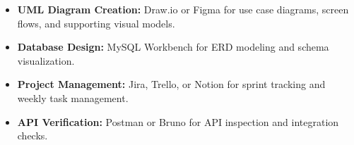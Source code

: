 \begin{itemize}
    \item \textbf{UML Diagram Creation:} Draw.io or Figma for use case diagrams, screen flows, and supporting visual models.
    \item \textbf{Database Design:} MySQL Workbench for ERD modeling and schema visualization.
    \item \textbf{Project Management:} Jira, Trello, or Notion for sprint tracking and weekly task management.
    \item \textbf{API Verification:} Postman or Bruno for API inspection and integration checks.
\end{itemize}
